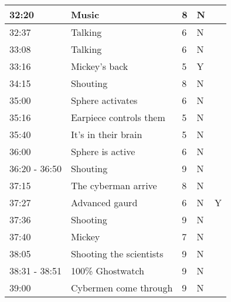 \begin{longtable}{| p{70pt} | p{130pt} | p{45pt} | p{57pt} | p{60pt}|}
32:20           &           Music           &           8           &           N          &           \\\hline
32:37           &           Talking           &           6           &           N          &           \\\hline
33:08           &           Talking           &           6           &           N          &           \\\hline
33:16           &           Mickey's back           &           5           &           Y          &           \\\hline
34:15           &           Shouting           &           8           &           N          &           \\\hline
35:00           &           Sphere activates           &           6           &           N          &           \\\hline
35:16           &           Earpiece controls them           &           5           &           N          &           \\\hline
35:40           &           It's in their brain           &           5           &           N          &           \\\hline
36:00           &           Sphere is active           &           6           &           N          &           \\\hline
36:20 - 36:50           &           Shouting           &           9           &           N          &           \\\hline
37:15           &           The cyberman arrive           &           8           &           N          &           \\\hline
37:27           &           Advanced gaurd           &           6           &           N          &Y           \\\hline
37:36           &           Shooting           &           9           &           N          &           \\\hline
37:40           &           Mickey           &           7           &           N          &           \\\hline
38:05           &           Shooting the scientists           &           9           &           N          &           \\\hline
38:31 - 38:51           &           100\% Ghostwatch           &           9           &           N          &           \\\hline
39:00           &           Cybermen come through           &           9           &           N          &           \\\hline

\end{longtable}

